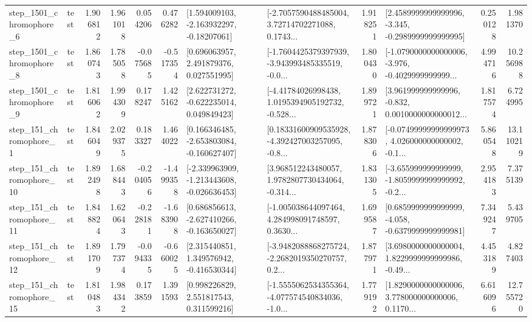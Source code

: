 \begin{tabular}{llrrrrllrlrr}
  step\_1501\_chromophore\_6 &      test &      1.906812 &    1.961018 &      0.054206 &  0.476282 &    [1.594009103, -2.163932297, -0.18207061] &  [-2.7057590488485004, 3.72714702271088, 0.1743... &       1.918251 &  [2.4589999999999996, -3.345, -0.2989999999999995] &            0.250128 &          1.981370 \\
  step\_1501\_chromophore\_8 &      test &      1.860743 &    1.785058 &     -0.075685 & -0.517354 &     [0.696063957, 2.491879376, 0.027551995] &  [-1.7604425379397939, -3.943993485335519, -0.0... &       1.800430 &  [-1.0790000000000006, -3.976, -0.4029999999999... &            4.994716 &         10.256988 \\
  step\_1501\_chromophore\_9 &      test &      1.816062 &    1.994309 &      0.178247 &  1.425162 &    [2.622731272, -0.622235014, 0.049849423] &  [-4.41784026998438, 1.0195394905192732, -0.528... &       1.899721 &  [3.961999999999996, -0.832, 0.0010000000000012... &            1.817574 &          6.724995 \\
   step\_151\_chromophore\_1 &      test &      1.846049 &    2.029375 &      0.183327 &  1.464022 &   [0.166346485, -2.653803084, -0.160627407] &  [0.18331600909535928, -4.392427003257095, -0.8... &       1.878306 &  [-0.07499999999999973, 4.026000000000002, -0.1... &            5.860548 &         13.110219 \\
  step\_151\_chromophore\_10 &      test &      1.892498 &    1.688443 &     -0.204056 & -1.499358 &  [-2.339963909, -1.213443608, -0.026636453] &  [3.968512243480057, 1.9782807730434064, -0.314... &       1.831305 &  [-3.655999999999999, -1.8059999999999992, -0.2... &            2.954183 &          7.375139 \\
  step\_151\_chromophore\_11 &      test &      1.848824 &    1.620643 &     -0.228181 & -1.683908 &   [0.686856613, -2.627410266, -0.163650027] &  [-1.005038644097464, 4.284998091748597, 0.3630... &       1.699587 &  [0.6859999999999999, -4.058, -0.6379999999999981] &            7.349247 &          5.439705 \\
  step\_151\_chromophore\_12 &      test &      1.891709 &    1.797374 &     -0.094335 & -0.660025 &    [2.315440851, 1.349576942, -0.416530344] &  [-3.9482088868275724, -2.2682019350270757, 0.2... &       1.877971 &  [3.6980000000000004, 1.8229999999999986, -0.49... &            4.453189 &          4.827403 \\
  step\_151\_chromophore\_15 &      test &      1.810483 &    1.984342 &      0.173859 &  1.391593 &     [0.998226829, 2.551817543, 0.311599216] &  [-1.5555062534355364, -4.077574540834036, -1.0... &       1.779192 &  [1.8290000000000006, 3.778000000000006, 0.1170... &            6.616096 &         12.755720 \\

\end{tabular}
